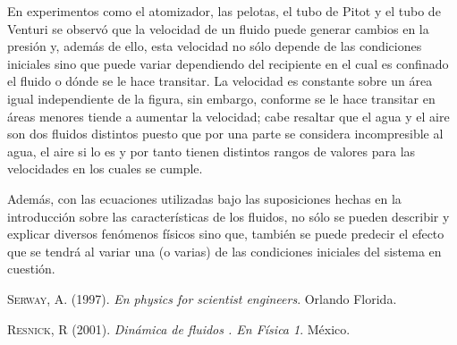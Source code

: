 \documentclass[10pt,a4paper]{article}
\begin{document}
En experimentos como el atomizador, las pelotas, el tubo de Pitot y el tubo de Venturi se observó que la velocidad de un fluido puede generar cambios en la presión y, además de ello, esta velocidad no sólo depende de las condiciones iniciales sino que puede variar dependiendo del recipiente en el cual es confinado el fluido o dónde se le hace transitar. La velocidad es constante sobre un área igual independiente de la figura, sin embargo, conforme se le hace transitar en áreas menores tiende a aumentar la velocidad; cabe resaltar que el agua y el aire son dos fluidos distintos puesto que por una parte se considera incompresible al agua, el aire si lo es y por tanto tienen distintos rangos de valores para las velocidades en los cuales se cumple. 

Además, con las ecuaciones utilizadas bajo las suposiciones hechas en la introducción sobre las características de los fluidos, no sólo se pueden describir y explicar diversos fenómenos físicos sino que, también se puede predecir el efecto que se tendrá al variar una (o varias) de las condiciones iniciales del sistema en cuestión.


\begin{thebibliography}{x}

 \textsc{Serway, A. }(1997). \textit { En physics for scientist engineers}. Orlando Florida.

 \textsc{Resnick, R }(2001). 
\textit{ Dinámica de fluidos . En Física 1}. México.


\end{thebibliography}
\end{document}
